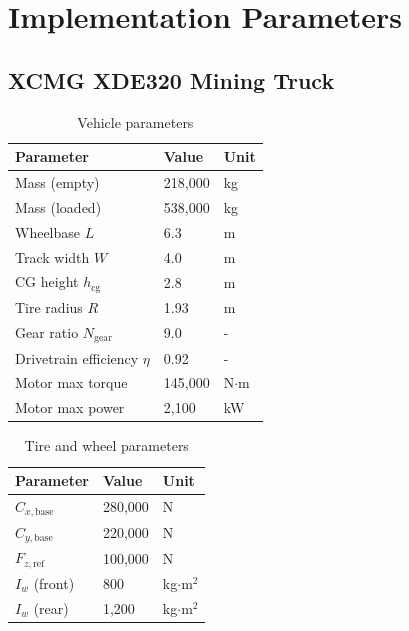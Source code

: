 \documentclass[11pt,a4paper]{article}
\begin{document}
\section{Implementation Parameters}

\subsection{XCMG XDE320 Mining Truck}

\begin{table}[H]
\centering
\begin{tabular}{lll}
\toprule
\textbf{Parameter} & \textbf{Value} & \textbf{Unit} \\
\midrule
Mass (empty) & 218,000 & kg \\
Mass (loaded) & 538,000 & kg \\
Wheelbase $L$ & 6.3 & m \\
Track width $W$ & 4.0 & m \\
CG height $h_{\text{cg}}$ & 2.8 & m \\
Tire radius $R$ & 1.93 & m \\
Gear ratio $N_{\text{gear}}$ & 9.0 & - \\
Drivetrain efficiency $\eta$ & 0.92 & - \\
Motor max torque & 145,000 & N$\cdot$m \\
Motor max power & 2,100 & kW \\
\bottomrule
\end{tabular}
\caption{Vehicle parameters}
\end{table}

\begin{table}[H]
\centering
\begin{tabular}{lll}
\toprule
\textbf{Parameter} & \textbf{Value} & \textbf{Unit} \\
\midrule
$C_{x,\text{base}}$ & 280,000 & N \\
$C_{y,\text{base}}$ & 220,000 & N \\
$F_{z,\text{ref}}$ & 100,000 & N \\
$I_w$ (front) & 800 & kg$\cdot$m$^2$ \\
$I_w$ (rear) & 1,200 & kg$\cdot$m$^2$ \\
\bottomrule
\end{tabular}
\caption{Tire and wheel parameters}
\end{table}
\end{document}

